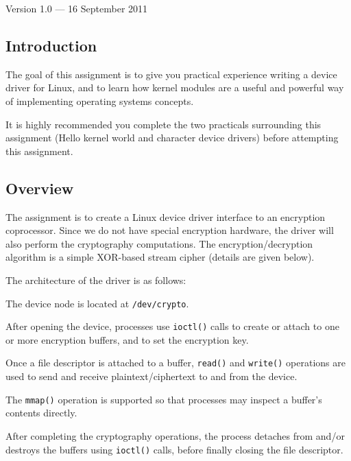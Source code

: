 \documentclass[12pt,a4paper]{article}
\begin{document}


\begin{center}
Version 1.0 --- 16 September 2011
\end{center}

\subsection*{Introduction}

The goal of this assignment is to give you practical experience writing a
device driver for Linux, and to learn how kernel modules are a useful and
powerful way of implementing operating systems concepts.

It is highly recommended you complete the two practicals surrounding this
assignment (Hello kernel world and character device drivers) before attempting
this assignment.



\subsection*{Overview}

The assignment is to create a Linux device driver interface to an encryption
coprocessor. Since we do not have special encryption hardware, the driver will
also perform the cryptography computations. The encryption/decryption algorithm
is a simple XOR-based stream cipher (details are given below).

The architecture of the driver is as follows:

\begin{compactitem}
    \item The device node is located at \texttt{/dev/crypto}.
    \item After opening the device, processes use \texttt{ioctl()} calls to
    create or attach to one or more encryption buffers, and to set the
    encryption key.
    \item Once a file descriptor is attached to a buffer, \texttt{read()} and
    \texttt{write()} operations are used to send and receive
    plaintext\slash ciphertext to and from the device.
    \item The \texttt{mmap()} operation is supported so that processes may inspect a buffer's contents directly.
    \item After completing the cryptography operations, the process detaches from
    and\slash or destroys the buffers using \texttt{ioctl()} calls, before finally
    closing the file descriptor.
\end{compactitem}
\end{document}
